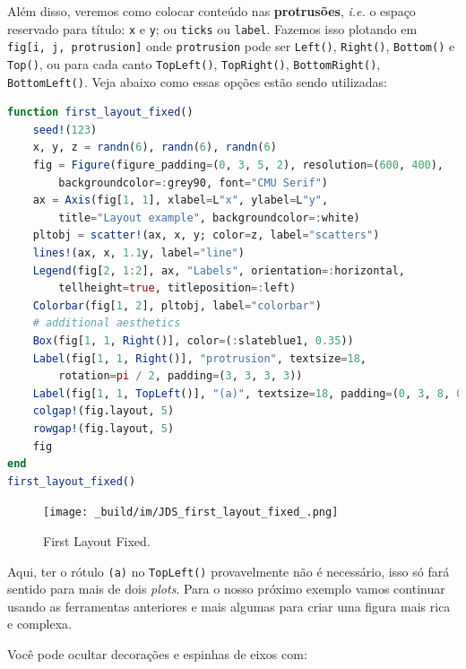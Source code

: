 \documentclass[
  notoc %
]{tufte-book}
\newcommand{\passthrough}[1]{#1}
\begin{document}
Além disso, veremos como colocar conteúdo nas \textbf{protrusões},
\emph{i.e.} o espaço reservado para título: \passthrough{\lstinline!x!}
e \passthrough{\lstinline!y!}; ou \passthrough{\lstinline!ticks!} ou
\passthrough{\lstinline!label!}. Fazemos isso plotando em
\passthrough{\lstinline!fig[i, j, protrusion]!} onde
\passthrough{\lstinline!protrusion!} pode ser
\passthrough{\lstinline!Left()!}, \passthrough{\lstinline!Right()!},
\passthrough{\lstinline!Bottom()!} e \passthrough{\lstinline!Top()!}, ou
para cada canto \passthrough{\lstinline!TopLeft()!},
\passthrough{\lstinline!TopRight()!},
\passthrough{\lstinline!BottomRight()!},
\passthrough{\lstinline!BottomLeft()!}. Veja abaixo como essas opções
estão sendo utilizadas:

\begin{lstlisting}[language=Julia]
function first_layout_fixed()
    seed!(123)
    x, y, z = randn(6), randn(6), randn(6)
    fig = Figure(figure_padding=(0, 3, 5, 2), resolution=(600, 400),
        backgroundcolor=:grey90, font="CMU Serif")
    ax = Axis(fig[1, 1], xlabel=L"x", ylabel=L"y",
        title="Layout example", backgroundcolor=:white)
    pltobj = scatter!(ax, x, y; color=z, label="scatters")
    lines!(ax, x, 1.1y, label="line")
    Legend(fig[2, 1:2], ax, "Labels", orientation=:horizontal,
        tellheight=true, titleposition=:left)
    Colorbar(fig[1, 2], pltobj, label="colorbar")
    # additional aesthetics
    Box(fig[1, 1, Right()], color=(:slateblue1, 0.35))
    Label(fig[1, 1, Right()], "protrusion", textsize=18,
        rotation=pi / 2, padding=(3, 3, 3, 3))
    Label(fig[1, 1, TopLeft()], "(a)", textsize=18, padding=(0, 3, 8, 0))
    colgap!(fig.layout, 5)
    rowgap!(fig.layout, 5)
    fig
end
first_layout_fixed()
\end{lstlisting}

\begin{figure}
\hypertarget{fig:first_layout_fixed}{%
\centering
\texttt{[image: \_build/im/JDS\_first\_layout\_fixed\_.png]}
\caption{First Layout Fixed.}\label{fig:first_layout_fixed}
}
\end{figure}

Aqui, ter o rótulo \passthrough{\lstinline!(a)!} no
\passthrough{\lstinline!TopLeft()!} provavelmente não é necessário, isso
só fará sentido para mais de dois \emph{plots}. Para o nosso próximo
exemplo vamos continuar usando as ferramentas anteriores e mais algumas
para criar uma figura mais rica e complexa.

Você pode ocultar decorações e espinhas de eixos com:
\end{document}
